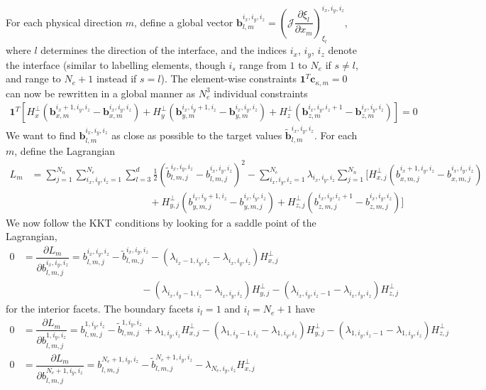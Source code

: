 \documentclass[12pt,a4paper]{article}
\newcommand{\pder}[2][]{\dfrac{\partial #1}{\partial #2}} %
\newcommand{\fn}[1]{\mathcal{#1}} %
\begin{document}
For each physical direction $m$, define a global vector $\bm{b}_{l,m}^{i_x,i_y,i_z} =  \left( \fn{J} \pder[\xi_l]{x_m} \right)_{\xi_l}^{i_x,i_y,i_z}$, where $l$ determines the direction of the interface, and the indices $i_x$, $i_y$, $i_z$ denote the interface (similar to labelling elements, though $i_s$ range from $1$ to $N_e$ if $s \neq l$, and range to $N_e+ 1$ instead if $s=l$). The element-wise constraints $\bm{1}^T \bm{c}_{\kappa , m} = 0$ can now be rewritten in a global manner as $N_e^3$ individual constraints 
\begin{align*}
\bm{1}^T \left[ H^\bot_{x} \left( \bm{b}_{x,m}^{i_x+1,i_y,i_z} - \bm{b}_{x,m}^{i_x,i_y,i_z} \right) + H^\bot_{y} \left( \bm{b}_{y,m}^{i_x,i_y+1,i_z} - \bm{b}_{y,m}^{i_x,i_y,i_z} \right) + H^\bot_{z} \left( \bm{b}_{z,m}^{i_x,i_y,i_z+1} - \bm{b}_{z,m}^{i_x,i_y,i_z} \right) \right] = 0
\end{align*}
We want to find $\bm{b}_{l,m}^{i_x,i_y,i_z}$ as close as possible to the target values $\tilde{\bm{b}}_{l,m}^{i_x,i_y,i_z}$. For each $m$, define the Lagrangian
\begin{align*}
L_m &= \sum_{j=1}^{N_n} \sum_{i_x,i_y,i_z=1}^{N_e} \sum_{l=3}^d \frac{1}{2} \left( \tilde{b}_{l,m,j}^{i_x,i_y,i_z} - b^{i_x,i_y,i_z}_{l,m,j} \right)^2 -  \sum_{i_x,i_y,i_z=1}^{N_e} \lambda_{i_x,i_y,i_z} \sum_{j=1}^{N_n} \Big[ H^\bot_{x,j} \left( b_{x,m,j}^{i_x+1,i_y,i_z} - b_{x,m,j}^{i_x,i_y,i_z} \right) \\
&\hspace{5cm} + H^\bot_{y,j} \left( b_{y,m,j}^{i_x,i_y+1,i_z} - b_{y,m,j}^{i_x,i_y,i_z} \right) + H^\bot_{z,j} \left( b_{z,m,j}^{i_x,i_y,i_z+1} - b_{z,m,j}^{i_x,i_y,i_z} \right) \Big]
\end{align*}
We now follow the KKT conditions by looking for a saddle point of the Lagrangian,
\begin{align*}
0 &= \pder[L_m]{b^{i_x,i_y,i_z}_{l,m,j}} = b_{l,m,j}^{i_x,i_y,i_z}  -  \tilde{b}^{i_x,i_y,i_z}_{l,m,j}  - \left( \lambda_{i_x-1,i_y,i_z} -  \lambda_{i_x,i_y,i_z} \right) H_{x , j}^\bot \\
&\hspace{5cm} - \left( \lambda_{i_x,i_y-1,i_z}  -  \lambda_{i_x,i_y,i_z} \right) H_{y , j}^\bot - \left( \lambda_{i_x,i_y,i_z-1} -  \lambda_{i_x,i_y,i_z} \right) H_{z , j}^\bot 
\end{align*}
for the interior facets. The boundary facets $i_l =1$ and $i_l = N_e+1$ have
\begin{align*}
0 &= \pder[L_m]{b^{1,i_y,i_z}_{l,m,j}} = b_{l,m,j}^{1,i_y,i_z}  -  \tilde{b}^{1,i_y,i_z}_{l,m,j}  + \lambda_{1,i_y,i_z} H_{x , j}^\bot - \left( \lambda_{1,i_y-1,i_z}  -  \lambda_{1,i_y,i_z} \right) H_{y , j}^\bot - \left( \lambda_{1,i_y,i_z-1} -  \lambda_{1,i_y,i_z} \right) H_{z , j}^\bot  \\
0 &= \pder[L_m]{b^{N_e+1,i_y,i_z}_{l,m,j}} = b_{l,m,j}^{N_e+1,i_y,i_z}  -  \tilde{b}^{N_e+1,i_y,i_z}_{l,m,j}  - \lambda_{N_e,i_y,i_z} H_{x , j}^\bot  
\end{align*}
\end{document}

